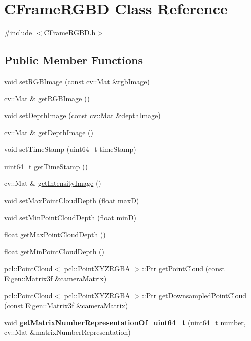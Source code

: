 \hypertarget{class_c_frame_r_g_b_d}{
\section{CFrameRGBD Class Reference}
\label{class_c_frame_r_g_b_d}
}


{\ttfamily \#include $<$CFrameRGBD.h$>$}

\subsection*{Public Member Functions}
\begin{DoxyCompactItemize}
\item 
void \hyperlink{class_c_frame_r_g_b_d_a1babff86224475dd7b7e6960fbb71663}{setRGBImage} (const cv::Mat \&rgbImage)
\item 
cv::Mat \& \hyperlink{class_c_frame_r_g_b_d_a6775deb1a76779b2f8de4cdc9dd6c548}{getRGBImage} ()
\item 
void \hyperlink{class_c_frame_r_g_b_d_a04b2bf58c8c5027148219675f626eeb7}{setDepthImage} (const cv::Mat \&depthImage)
\item 
cv::Mat \& \hyperlink{class_c_frame_r_g_b_d_a21d4754f8db3a0a93dbe1d67a00f4ce5}{getDepthImage} ()
\item 
void \hyperlink{class_c_frame_r_g_b_d_ab778d5eb102f577cc338ee1812846ac9}{setTimeStamp} (uint64\_\-t timeStamp)
\item 
uint64\_\-t \hyperlink{class_c_frame_r_g_b_d_a9c441cdc349038fae31bffc4d0202b2c}{getTimeStamp} ()
\item 
cv::Mat \& \hyperlink{class_c_frame_r_g_b_d_a7fd118a6a456ee314009f1fd260e70e0}{getIntensityImage} ()
\item 
void \hyperlink{class_c_frame_r_g_b_d_ae20f37738bca2f2db2a10bfff882ddd5}{setMaxPointCloudDepth} (float maxD)
\item 
void \hyperlink{class_c_frame_r_g_b_d_af763a5da39ec146c6456bf155cac76ba}{setMinPointCloudDepth} (float minD)
\item 
float \hyperlink{class_c_frame_r_g_b_d_a4009c7bfb6e5d62ac13dd04fd6430dc5}{getMaxPointCloudDepth} ()
\item 
float \hyperlink{class_c_frame_r_g_b_d_a00b651160ddf1cac5ed8c3b0edfa3c3c}{getMinPointCloudDepth} ()
\item 
pcl::PointCloud$<$ pcl::PointXYZRGBA $>$::Ptr \hyperlink{class_c_frame_r_g_b_d_aae45ce5efb781c914ec8b420970ce492}{getPointCloud} (const Eigen::Matrix3f \&cameraMatrix)
\item 
pcl::PointCloud$<$ pcl::PointXYZRGBA $>$::Ptr \hyperlink{class_c_frame_r_g_b_d_af2d7e89a8f680b567f4b798beb075f8e}{getDownsampledPointCloud} (const Eigen::Matrix3f \&cameraMatrix)
\item 
\hypertarget{class_c_frame_r_g_b_d_a976a8d17209c3b3190ea7404a4d2464e}{
void {\bfseries getMatrixNumberRepresentationOf\_\-uint64\_\-t} (uint64\_\-t number, cv::Mat \&matrixNumberRepresentation)}
\label{class_c_frame_r_g_b_d_a976a8d17209c3b3190ea7404a4d2464e}


\end{DoxyCompactItemize}
